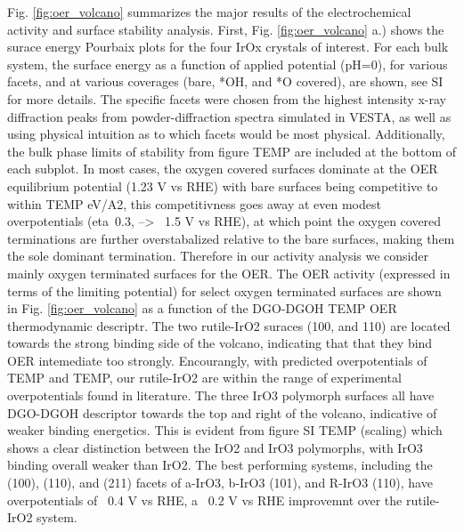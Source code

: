 Fig. \ref{fig:oer_volcano} summarizes the major results of the electrochemical activity and surface stability analysis.
First, Fig. \ref{fig:oer_volcano} a.) shows the surace energy Pourbaix plots for the four IrOx crystals of interest. For each bulk system, the surface energy as a function of applied potential (pH=0), for various facets, and at various coverages (bare, *OH, and *O covered), are shown, see SI for more details.
The specific facets were chosen from the highest intensity x-ray diffraction peaks from powder-diffraction spectra simulated in VESTA,
as well as using physical intuition as to which facets would be most physical.
Additionally, the bulk phase limits of stability from figure TEMP are included at the bottom of each subplot.
In most cases, the oxygen covered surfaces dominate at the OER equilibrium potential (1.23 V vs RHE) with bare surfaces being competitive to within TEMP eV/A2,
this competitivness goes away at even modest overpotentials (eta~0.3, --> ~1.5 V vs RHE),
at which point the oxygen covered terminations are further overstabalized relative to the bare surfaces,
making them the sole dominant termination.
Therefore in our activity analysis we consider mainly oxygen terminated surfaces for the OER.
The OER activity (expressed in terms of the limiting potential) for select oxygen terminated surfaces are shown in Fig. \ref{fig:oer_volcano} as a function of the DGO-DGOH TEMP OER thermodynamic descriptr.
The two rutile-IrO2 suraces (100, and 110) are located towards the strong binding side of the volcano, indicating that that they bind OER intemediate too strongly.
Encourangly, with predicted overpotentials of TEMP and TEMP, our rutile-IrO2 are within the range of experimental overpotentials found in literature.
The three IrO3 polymorph surfaces all have DGO-DGOH descriptor towards the top and right of the volcano, indicative of weaker binding energetics.
This is evident from figure SI TEMP (scaling) which shows a clear distinction between the IrO2 and IrO3 polymorphs, with IrO3 binding overall weaker than IrO2.
The best performing systems, including the (100), (110), and (211) facets of a-IrO3, b-IrO3 (101), and R-IrO3 (110), have overpotentials of ~0.4 V vs RHE,
a ~0.2 V vs RHE improvemnt over the rutile-IrO2 system.


